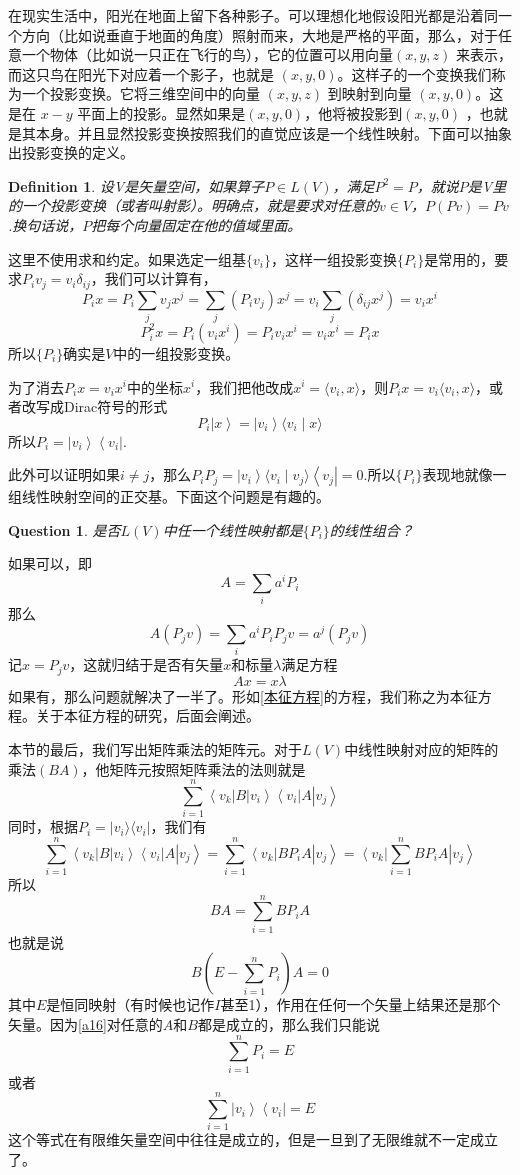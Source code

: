 \documentclass[11pt,a4paper,openany]{book}%
\theoremstyle{plain}%
\newtheorem{que}{Question}[chapter]%
\newtheorem{defi}{Definition}[chapter]%
\newcommand{\bra}[1]{\left\langle #1\right|} %
\newcommand{\ket}[1]{\left| #1\right\rangle}
\newcommand{\braket}[2]{\langle #1 \mid #2 \rangle}
\begin{document}
在现实生活中，阳光在地面上留下各种影子。可以理想化地假设阳光都是沿着同一个方向（比如说垂直于地面的角度）照射而来，大地是严格的平面，那么，对于任意一个物体（比如说一只正在飞行的鸟），它的位置可以用向量$ (x, y, z)$ 来表示，而这只鸟在阳光下对应着一个影子，也就是 $(x, y, 0)$。这样子的一个变换我们称为一个投影变换。它将三维空间中的向量 $(x, y, z)$ 到映射到向量 $(x, y, 0) $。这是在 $x-y$ 平面上的投影。显然如果是$(x, y, 0)$，他将被投影到$(x, y, 0)$ ，也就是其本身。并且显然投影变换按照我们的直觉应该是一个线性映射。下面可以抽象出投影变换的定义。
\begin{defi}
设V是矢量空间，如果算子$P\in L(V)$，满足$P^2=P$，就说$P$是V里的一个投影变换（或者叫射影）。明确点，就是要求对任意的$v\in V$，$P(Pv)=Pv$.换句话说，$P$把每个向量固定在他的值域里面。
\end{defi}
这里不使用求和约定。如果选定一组基$\{v_i\}$，这样一组投影变换$\{P_i\}$是常用的，要求$P_iv_j=v_i\delta_{ij}$，我们可以计算有，
\[
P_ix=P_i\sum_j v_jx^j=\sum_j(P_iv_j)x^j=v_i\sum_j(\delta_{ij}x^j)=v_ix^i
\]
\[
P_i^2x=P_i(v_ix^i)=P_iv_ix^i=v_ix^i=P_ix
\]
所以$\{P_i\}$确实是$V$中的一组投影变换。

为了消去$P_ix=v_ix^i$中的坐标$x^i$，我们把他改成$x^i=\langle v_i,x \rangle$，则$P_ix=v_i\langle v_i,x \rangle$，或者改写成Dirac符号的形式
\[
P_i\ket{x}=\ket{v_i}\braket{v_i}{x}
\]
所以$P_i=\ket{v_i}\bra{v_i}$.

此外可以证明如果$i\neq j$，那么$P_iP_j=\ket{v_i}\braket{v_i}{v_j}\bra{v_j}=0$.所以$\{P_i\}$表现地就像一组线性映射空间的正交基。下面这个问题是有趣的。
\begin{que}
是否$L(V)$中任一个线性映射都是$\{P_i\}$的线性组合？
\end{que}
如果可以，即
\[
A=\sum_i a^iP_i
\]
那么
\[
A(P_jv)=\sum_i a^iP_iP_jv=a^j(P_jv)
\]
记$x=P_jv$，这就归结于是否有矢量$x$和标量$\lambda$满足方程
\begin{equation}
\label{本征方程}
Ax=x\lambda
\end{equation}
如果有，那么问题就解决了一半了。形如\eqref{本征方程}的方程，我们称之为{\kaishu 本征方程}。关于本征方程的研究，后面会阐述。

本节的最后，我们写出矩阵乘法的矩阵元。对于$L(V)$中线性映射对应的矩阵的乘法$(BA)$，他矩阵元按照矩阵乘法的法则就是
\[
\sum_{i=1}^{n}\bra{v_k}B\ket{v_i}\bra{v_i}A\ket{v_j}
\]
同时，根据$P_i=|v_i\rangle\langle v_i|$，我们有
\[
\sum_{i=1}^{n}\bra{v_k}B\ket{v_i}\bra{v_i}A\ket{v_j}=
\sum_{i=1}^{n}\bra{v_k}BP_iA\ket{v_j}=
\bra{v_k}\sum_{i=1}^{n}BP_iA\ket{v_j}
\]
所以
\[
BA=\sum_{i=1}^{n}BP_iA
\]
也就是说
\begin{equation}
\label{a16}
B\left(E-\sum_{i=1}^{n}P_i\right)A=0
\end{equation}
其中$E$是恒同映射（有时候也记作$I$甚至1），作用在任何一个矢量上结果还是那个矢量。因为\eqref{a16}对任意的$A$和$B$都是成立的，那么我们只能说
\[
\sum_{i=1}^{n}P_i=E
\]
或者
\[
\sum_{i=1}^{n}\ket{v_i}\bra{v_i}=E
\]
这个等式在有限维矢量空间中往往是成立的，但是一旦到了无限维就不一定成立了。
\end{document}
